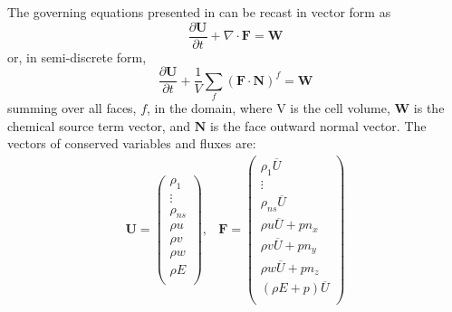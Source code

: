 The governing equations presented in  can
be recast in vector form as
\begin{equation}
	\label{inv_flux_vec}
	\frac{\partial \mathbf{U}}{\partial t}
	+ \nabla\cdot \mathbf{F} = \mathbf{W}
\end{equation}
 or, in semi-discrete form,
\begin{equation}
	\label{inv_flux_fv}
	\frac{\partial \mathbf{U}}{\partial t}
	 + \frac{1}{V}\sum\limits_{f}(\mathbf{F}\cdot\mathbf{N})^f = \mathbf{W}
 \end{equation}
summing over all faces, $f$, in the domain, where V is the cell volume, 
$\mathbf{W}$ is the chemical source term vector, and $\mathbf{N}$ is the face
outward normal vector.  The vectors of conserved variables and fluxes are:
\begin{equation}
	\begin{matrix}
	\mathbf{U}=\begin{pmatrix}
   		\rho_1\\
		\vdots \\
		\rho_{ns} \\
		\rho u \\
		\rho v \\
		\rho w \\
		\rho E \\
	\end{pmatrix},      &
 	\mathbf{F} = \begin{pmatrix}
		\rho_1  \overline{U} \\
		\vdots \\
		\rho_{ns} \overline{U} \\
		\rho u \overline{U} + p n_x\\
		\rho v \overline{U} + p n_y\\
		\rho w \overline{U} + p n_z\\
		(\rho E + p) \overline{U} \\
	\end{pmatrix}
	\end{matrix}
  \label{fc-variables}
 \end{equation}
